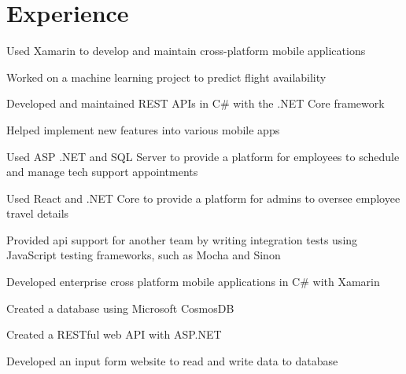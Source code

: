 \documentclass[]{deedy-resume-openfont}
\begin{document}
\hfill
\begin{minipage}[t]{0.60\textwidth} 


\section{Experience}

\vspace{\topsep}
\begin{tightemize}
\item Used Xamarin to develop and maintain cross-platform mobile applications
\item Worked on a machine learning project to predict flight availability
\item Developed and maintained REST APIs in C\# with the .NET Core framework
\item Helped implement new features into various mobile apps
\item Used ASP .NET and SQL Server to provide a platform for employees to schedule and manage tech support appointments
\item Used React and .NET Core to provide a platform for admins to oversee employee travel details
\item Provided api support for another team by writing integration tests using JavaScript testing frameworks, such as Mocha and Sinon
\end{tightemize}
\sectionsep

\vspace{\topsep}
\begin{tightemize}
\item Developed enterprise cross platform mobile applications in C\# with Xamarin
\item Created a database using Microsoft CosmosDB
\item Created a RESTful web API with ASP.NET
\item Developed an input form website to read and write data to database
\end{tightemize}
\sectionsep


\end{minipage}
\end{document}
